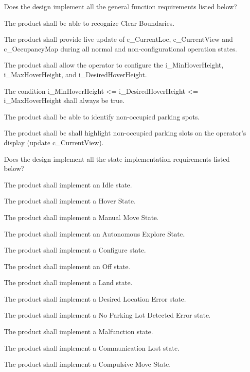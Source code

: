 \documentclass[12pt, titlepage]{article}
\begin{document}
\begin{todolist}
\label{Design1_Checklist}
\item Does the design implement all the general function requirements listed below?
\begin{todolist}
    \item The product shall be able to recognize Clear Boundaries.
    \item The product shall provide live update of c\_CurrentLoc, c\_CurrentView and c\_OccupancyMap during all normal and non-configurational operation states.
    \item The product shall allow the operator to configure the i\_MinHoverHeight, i\_MaxHoverHeight, and i\_DesiredHoverHeight.
    \item The condition i\_MinHoverHeight <= i\_DesiredHoverHeight <= i\_MaxHoverHeight shall always be true.
    \item The product shall be able to identify non-occupied parking spots.
    \item The product shall be shall highlight non-occupied parking slots on the operator's display (update c_CurrentView).
\end{todolist}
\item Does the design implement all the state implementation requirements listed below?
\begin{todolist}
    \item The product shall implement an Idle state.
    \item The product shall implement a Hover State.
    \item The product shall implement a Manual Move State.
    \item The product shall implement an Autonomous Explore State.
    \item The product shall implement a Configure state.
    \item The product shall implement an Off state.
    \item The product shall implement a Land state.
    \item The product shall implement a Desired Location Error state.
    \item The product shall implement a No Parking Lot Detected Error state.
    \item The product shall implement a Malfunction state.
    \item The product shall implement a Communication Lost state.
    \item The product shall implement a Compulsive Move State.

\end{todolist}
\end{todolist}
\end{document}
